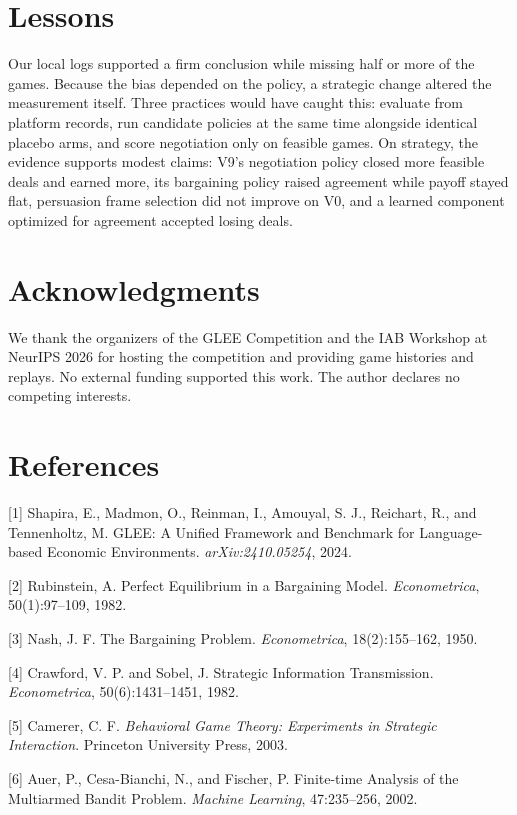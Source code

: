 \documentclass{article}
\begin{document}
\section{Lessons}

Our local logs supported a firm conclusion while missing half or more of the games. Because the bias depended on the policy, a strategic change altered the measurement itself. Three practices would have caught this: evaluate from platform records, run candidate policies at the same time alongside identical placebo arms, and score negotiation only on feasible games. On strategy, the evidence supports modest claims: V9's negotiation policy closed more feasible deals and earned more, its bargaining policy raised agreement while payoff stayed flat, persuasion frame selection did not improve on V0, and a learned component optimized for agreement accepted losing deals.

\section*{Acknowledgments}
We thank the organizers of the GLEE Competition and the IAB Workshop at NeurIPS 2026 for hosting the competition and providing game histories and replays. No external funding supported this work. The author declares no competing interests.

\section*{References}
\small

[1] Shapira, E., Madmon, O., Reinman, I., Amouyal, S. J., Reichart, R., and Tennenholtz, M. GLEE: A Unified Framework and Benchmark for Language-based Economic Environments. \emph{arXiv:2410.05254}, 2024.

[2] Rubinstein, A. Perfect Equilibrium in a Bargaining Model. \emph{Econometrica}, 50(1):97--109, 1982.

[3] Nash, J. F. The Bargaining Problem. \emph{Econometrica}, 18(2):155--162, 1950.

[4] Crawford, V. P. and Sobel, J. Strategic Information Transmission. \emph{Econometrica}, 50(6):1431--1451, 1982.

[5] Camerer, C. F. \emph{Behavioral Game Theory: Experiments in Strategic Interaction}. Princeton University Press, 2003.

[6] Auer, P., Cesa-Bianchi, N., and Fischer, P. Finite-time Analysis of the Multiarmed Bandit Problem. \emph{Machine Learning}, 47:235--256, 2002.
\end{document}
